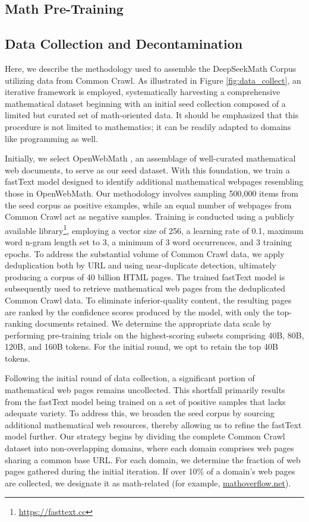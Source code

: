 \begin{itemize}[topsep=0pt]
\section{Math Pre-Training}

\subsection{Data Collection and Decontamination} Here, we describe the methodology used to assemble the DeepSeekMath Corpus utilizing data from Common Crawl. As illustrated in Figure \ref{fig:data_collect}, an iterative framework is employed, systematically harvesting a comprehensive mathematical dataset beginning with an initial seed collection composed of a limited but curated set of math-oriented data. It should be emphasized that this procedure is not limited to mathematics; it can be readily adapted to domains like programming as well.

Initially, we select OpenWebMath \citep{openwebmath}, an assemblage of well-curated mathematical web documents, to serve as our seed dataset. With this foundation, we train a fastText model \citep{joulin2016fasttext} designed to identify additional mathematical webpages resembling those in OpenWebMath. Our methodology involves sampling 500,000 items from the seed corpus as positive examples, while an equal number of webpages from Common Crawl act as negative samples. Training is conducted using a publicly available library\footnote{\url{https://fasttext.cc}}, employing a vector size of 256, a learning rate of 0.1, maximum word n-gram length set to 3, a minimum of 3 word occurrences, and 3 training epochs. To address the substantial volume of Common Crawl data, we apply deduplication both by URL and using near-duplicate detection, ultimately producing a corpus of 40 billion HTML pages. The trained fastText model is subsequently used to retrieve mathematical web pages from the deduplicated Common Crawl data. To eliminate inferior-quality content, the resulting pages are ranked by the confidence scores produced by the model, with only the top-ranking documents retained. We determine the appropriate data scale by performing pre-training trials on the highest-scoring subsets comprising 40B, 80B, 120B, and 160B tokens. For the initial round, we opt to retain the top 40B tokens.

Following the initial round of data collection, a significant portion of mathematical web pages remains uncollected. This shortfall primarily results from the fastText model being trained on a set of positive samples that lacks adequate variety. To address this, we broaden the seed corpus by sourcing additional mathematical web resources, thereby allowing us to refine the fastText model further. Our strategy begins by dividing the complete Common Crawl dataset into non-overlapping domains, where each domain comprises web pages sharing a common base URL. For each domain, we determine the fraction of web pages gathered during the initial iteration. If over 10\% of a domain’s web pages are collected, we designate it as math-related (for example, \url{mathoverflow.net}).


\end{itemize}
